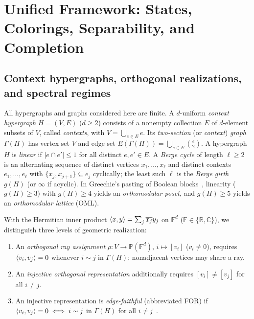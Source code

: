 \documentclass[aps,pra,reprint,superscriptaddress,longbibliography,nofootinbib,floatfix,10pt]{revtex4-2}
\theoremstyle{definition}\newtheorem{definition}[theorem]{Definition}
\theoremstyle{remark}\newtheorem{remark}[theorem]{Remark}
\newcommand{\C}{\mathbb C}\newcommand{\R}{\mathbb R}\newcommand{\Q}{\mathbb Q}
\newcommand{\F}{\mathbb F}\newcommand{\Z}{\mathbb Z}\newcommand{\PP}{\mathbb P}
\begin{document}
\section{Unified Framework: States, Colorings, Separability, and Completion}\label{sec:definitions}

\subsection{Context hypergraphs, orthogonal realizations, and spectral regimes}

All hypergraphs and graphs considered here are finite. A $d$-uniform \emph{context hypergraph} $H=(V,E)$ ($d\ge2$) consists of a nonempty collection $E$ of $d$-element subsets of $V$, called \emph{contexts}, with $V=\bigcup_{e\in E}e$. Its \emph{two-section} (or \emph{context}) \emph{graph} $\Gamma(H)$ has vertex set $V$ and edge set $E(\Gamma(H))=\bigcup_{e\in E}\binom{e}{2}$. A hypergraph $H$ is \emph{linear} if $|e\cap e'|\le 1$ for all distinct $e,e'\in E$. A \emph{Berge cycle} of length $\ell\ge2$ is an alternating sequence of distinct vertices $x_1,\ldots,x_\ell$ and distinct contexts $e_1,\ldots,e_\ell$ with $\{x_j,x_{j+1}\}\subseteq e_j$ cyclically; the least such $\ell$ is the \emph{Berge girth} $g(H)$ (or $\infty$ if acyclic). In Greechie's pasting of Boolean blocks~\cite{greechie:71,svozil-tkadlec}, linearity ($g(H)\ge3$) with $g(H)\ge4$ yields an \emph{orthomodular poset}, and $g(H)\ge5$ yields an \emph{orthomodular lattice} (OML).

With the Hermitian inner product $\langle x,y\rangle=\sum_j\overline{x_j}y_j$ on $\F^d$ ($\F\in\{\R,\C\}$), we distinguish three levels of geometric realization:
\begin{enumerate}
\item An \emph{orthogonal ray assignment} $\rho:V\to\PP(\F^d)$, $i\mapsto[v_i]$ ($v_i\ne0$), requires $\langle v_i,v_j\rangle=0$ whenever $i\sim j$ in $\Gamma(H)$; nonadjacent vertices may share a ray.
\item An \emph{injective orthogonal representation} additionally requires $[v_i]\ne[v_j]$ for all $i\ne j$.
\item An injective representation is \emph{edge-faithful} (abbreviated FOR) if $\langle v_i,v_j\rangle=0 \iff i\sim j$ in $\Gamma(H)$ for all $i\ne j$~\cite{hogben2017orthogonal}.
\end{enumerate}
\end{document}
